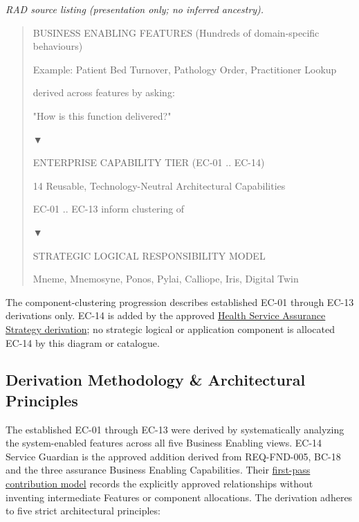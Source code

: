 \label{rad:enterprise:12}

\textit{RAD source listing (presentation only; no inferred ancestry).}
\begin{quote}
BUSINESS ENABLING FEATURES (Hundreds of domain-specific behaviours)

Example: Patient Bed Turnover, Pathology Order, Practitioner Lookup

derived across features by asking:

"How is this function delivered?"

▼

ENTERPRISE CAPABILITY TIER (EC-01 .. EC-14)

14 Reusable, Technology-Neutral Architectural Capabilities

EC-01 .. EC-13 inform clustering of

▼

STRATEGIC LOGICAL RESPONSIBILITY MODEL

Mneme, Mnemosyne, Ponos, Pylai, Calliope, Iris, Digital Twin
\end{quote}
\label{rad:enterprise:32}

The component-clustering progression describes established EC-01 through EC-13 derivations only. EC-14 is added by the approved \hyperref[rad:assurance-strategy]{Health Service Assurance Strategy derivation}; no strategic logical or application component is allocated EC-14 by this diagram or catalogue.

\label{rad:enterprise:34}

\par\smallskip
{}\label{rad:enterprise:36}
\subsection*{Derivation Methodology \& Architectural Principles}
\label{rad:enterprise:38}

The established EC-01 through EC-13 were derived by systematically analyzing the system-enabled features across all five Business Enabling views. EC-14 Service Guardian is the approved addition derived from REQ-FND-005, BC-18 and the three assurance Business Enabling Capabilities. Their \hyperref[rad:assurance-strategy:54]{first-pass contribution model} records the explicitly approved relationships without inventing intermediate Features or component allocations. The derivation adheres to five strict architectural principles:

